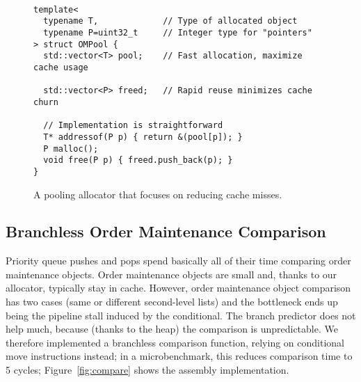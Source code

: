 \begin{figure}
\begin{verbatim}

template<
  typename T,             // Type of allocated object
  typename P=uint32_t     // Integer type for "pointers"
> struct OMPool {
  std::vector<T> pool;    // Fast allocation, maximize cache usage

  std::vector<P> freed;   // Rapid reuse minimizes cache churn
  
  // Implementation is straightforward
  T* addressof(P p) { return &(pool[p]); }
  P malloc();
  void free(P p) { freed.push_back(p); }
}
\end{verbatim}
\caption{A pooling allocator that focuses on reducing cache misses.}
\label{fig:allocator}
\end{figure}

\subsection{Branchless Order Maintenance Comparison}
Priority queue pushes and pops spend basically all of their time
  comparing order maintenance objects.
Order maintenance objects are small and,
  thanks to our allocator, typically stay in cache.
However, order maintenance object comparison has two cases
  (same or different second-level lists)
  and the bottleneck ends up being the pipeline stall
  induced by the conditional.
The branch predictor does not help much,
  because (thanks to the heap) the comparison is unpredictable.
We therefore implemented a branchless comparison function,
  relying on conditional move instructions instead;
  in a microbenchmark, this reduces comparison time
  to 5 cycles; Figure~\ref{fig:compare} shows the
  assembly implementation.


